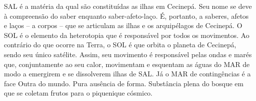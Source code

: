 SAL é a matéria da qual são constituídas as ilhas em Cecinepá. Seu nome se deve à compreensão do saber enquanto saber-afeto-laço. É, portanto, a saberes, afetos e laços -- a corpos -- que se articulam as ilhas e os arquipélagos de Cecinepá.
O SOL é o elemento da heterotopia que é responsável por todos os movimentos. Ao contrário do que ocorre na Terra, o SOL é que orbita o planeta de Cecinepá, sendo seu único satélite. Assim, seu movimento é responsável pelas ondas e marés que, conjuntamente ao seu calor, movimentam e esquentam as águas do MAR de modo a emergirem e se dissolverem ilhas de SAL.
Já o MAR de contingências é a face Outra do mundo. Pura ausência de forma. Substância plena do bosque em que se coletam frutos para o piquenique cósmico.